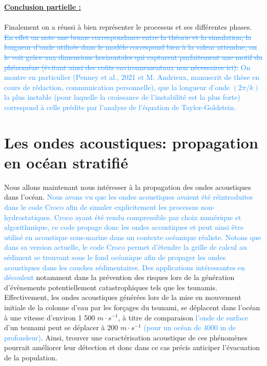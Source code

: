 \documentclass{rapportECC}
\newcommand{\FAadd}[1]{\textcolor{DodgerBlue}{{#1}}}                     %
\newcommand{\FAdel}[1]{\textcolor{DodgerBlue}{\sout{#1}}}                %
\begin{document}
\underline{\textbf{Conclusion partielle :}} \\
\\


Finalement on a réussi à bien représenter le processus et ses différentes phases. \FAdel{En effet on note une bonne correspondance entre la théorie et la simulation, la longueur d'onde utilisée dans le modèle correspond bien à la valeur attendue, on le voit grâce aux dimensions horizontales qui capturent parfaitement une motif du phénomène (évitant ainsi des coûts environnementaux non nécessaires ici).}
\FAadd{On montre en particulier (Penney et al., 2021 et M. Andrieux, manuscrit de thèse en cours de rédaction, communication personnelle), que la longueur d'onde $(2\pi/k)$ la plus instable (pour laquelle la croissance de l'instabilité est la plus forte) correspond à celle prédite par l'analyse de l'équation de Taylor-Goldstein.}
\\

\section{Les ondes acoustiques: propagation en océan stratifié}

Nous allons maintenant nous intéresser à la propagation des ondes acoustiques dans l'océan. \FAadd{Nous avons vu que les ondes acoustiques avaient été réintroduites dans le code Croco afin de simuler explicitement les processus non-hydrostatiques. Croco ayant été rendu compressible par choix numérique et algorithmique, ce code propage donc les ondes acoustiques et peut ainsi être utilisé en acoustique sous-marine dans un contexte océanique réaliste. Notons que dans sa version actuelle, le code Croco permet d'étendre la grille de calcul au sédiment se trouvant sous le fond océanique afin de propager les ondes acoustiques dans les couches sédimentaires.
Des applications intéressantes en découlent } notamment dans la prévention des risques lors de la génération d'évènements potentiellement catastrophiques tels que les tsunamis. Effectivement, les ondes acoustiques générées lors de la mise en mouvement initiale de la colonne d'eau par les forçages du tsunami, se déplacent dans l'océan à une vitesse d'environ 1 500 $m \cdot s^{-1}$, à titre de comparaison \FAadd{l'onde de surface} d'un tsunami peut se déplacer à 200 $m \cdot s^{-1}$ \FAadd{(pour un océan de 4000 m de profondeur)}. Ainsi, trouver une caractérisation acoustique de ces phénomènes pourrait améliorer leur détection et donc dans ce cas précis anticiper l'évacuation de la population.
\end{document}
